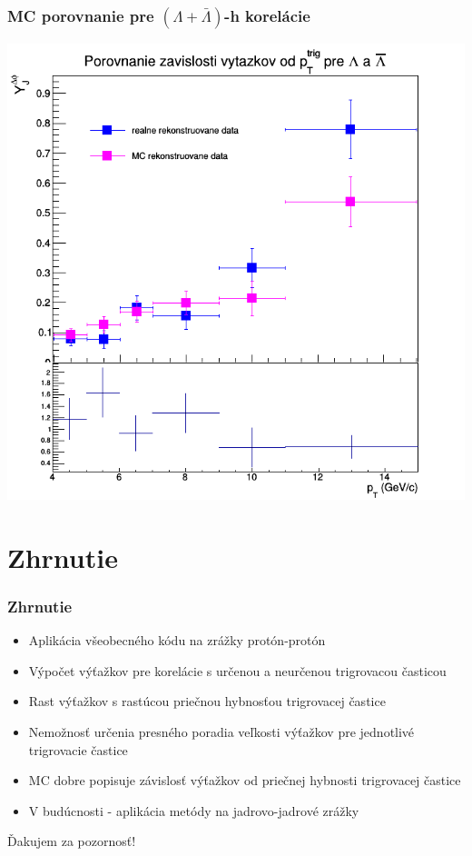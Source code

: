\documentclass{beamer}
\begin{document}
\begin{frame}
\frametitle{MC porovnanie pre $(\Lambda+\bar{\Lambda})$-h korelácie}
\centering \includegraphics[scale=0.3]{../Obrazky_praca/Vytazok_porovnanieMCl.png}

\end{frame}

\section{Zhrnutie}

\begin{frame}
	\frametitle{Zhrnutie}
	\begin{itemize}
		\item Aplikácia všeobecného kódu na zrážky protón-protón
		\item Výpočet výťažkov pre korelácie s určenou a neurčenou trigrovacou časticou
		\item Rast výťažkov s rastúcou priečnou hybnosťou trigrovacej častice
		\item Nemožnosť určenia presného poradia veľkosti výťažkov pre jednotlivé trigrovacie častice
		\item MC dobre popisuje závislosť výťažkov od priečnej hybnosti trigrovacej častice
		\item V budúcnosti - aplikácia metódy na jadrovo-jadrové zrážky
	\end{itemize}
\end{frame}

	\begin{frame}
	 \centering	\LARGE Ďakujem za pozornosť!	
	\end{frame}
\end{document}
